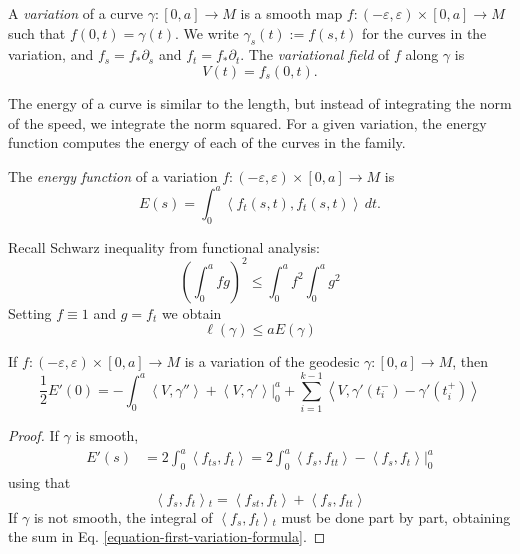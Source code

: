 \documentclass{book}
\begin{document}
\begin{definition}
\label{definition-variation}
A {\it variation} of a curve
$\gamma:[0,a]\to M$ is a smooth map
$f:(-\varepsilon,\varepsilon)\times[0,a]\to
M$ such that $f(0,t)=\gamma(t)$. We write
$\gamma_s(t):=f(s,t)$ for the curves in the
variation, and
$f_s=f_*\partial_s$ and $f_t=f_*\partial_t$.
The {\it variational field} of $f$ along
$\gamma$ is
$$
V(t)=f_s(0,t).
$$
\end{definition}

\noindent
The energy of a curve is similar
to the length, but instead of integrating
the norm of the speed,
we integrate the norm squared.
For a given variation, the energy
function computes the energy of each of
the curves in the family.

\begin{definition}
\label{definition-energy}
The {\it energy function} of a variation
$f:(-\varepsilon,\varepsilon)\times[0,a]\to
M$ is
$$
E(s)=\int_0^a\left\langle{}f_t(s,t),f_t(s,t)\right\rangle{}\,dt.
$$
\end{definition}

\noindent
Recall Schwarz inequality from functional
analysis:
$$
\left(\int_0^afg\right)^2\leq
\int_0^af^2\int_0^ag^2
$$
Setting $f\equiv1$ and $g=f_t$ we obtain
\begin{equation}
\label{equation-energy-bounds-length}
\ell(\gamma)\leq aE(\gamma)
\end{equation}

\begin{theorem}
\label{theorem-first-variation-formula}
If  $f:(-\varepsilon,\varepsilon)\times[0,a]
\to M$ is a variation of
the geodesic $\gamma:[0,a]\to M$, then
\begin{equation}
\label{equation-first-variation-formula}
\frac{1}{2}E'(0)=-\int_0^a\left\langle{}V,
\gamma''\right\rangle{}+\left\langle{}V,\gamma'\right\rangle{}|_{0}^a
+\sum_{i=1}^{k-1}\left\langle{}V,\gamma'(t_{i}^-)-
\gamma'(t_i^+)\right\rangle{}
\end{equation}
\end{theorem}

\begin{proof}
If $\gamma$ is smooth,
$$
\begin{aligned}
E'(s)&=
2\int_0^a\left\langle{}f_{ts},f_t\right\rangle{}
=2\int_0^a\left\langle{}f_s,f_{tt}\right\rangle{}-\left\langle{}f_s,
f_t\right\rangle{}|_{0}^a
\end{aligned}
$$
using that
$$
\left\langle{}f_s,f_t\right\rangle{}_t=\left\langle{}f_{st},
f_t\right\rangle{}+\left\langle{}f_s,f_{tt}\right\rangle{}
$$
If $\gamma$ is not smooth, the integral of
$\left\langle{}f_s,f_t\right\rangle{}_t$ must be
done part by part, obtaining the sum in Eq.
\ref{equation-first-variation-formula}.
\end{proof}
\end{document}
